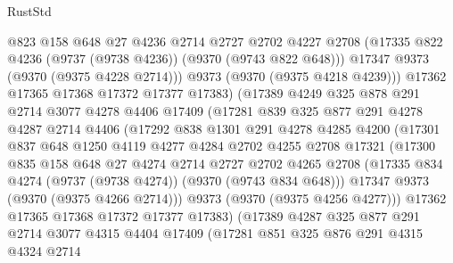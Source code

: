 \begin{lexlean}{RustStd}
\begin{coremodule}
{\begin{coremodule}
{{{{{{{{{{{{{{{{{{{{{{{{{{{{{{{{{{{{{{{                  @823
                  @158
                  @648
                  @27
                  @4236
                  @2714
                  @2727
                  @2702
                  @4227
                  @2708
                  (@17335 @822 @4236 (@9737 (@9738 @4236)) (@9370 (@9743 @822 @648)))
                  @17347
                  @9373
                  (@9370 (@9375 @4228 @2714)))
                @9373
                (@9370 (@9375 @4218 @4239)))
              @17362
              @17365
              @17368
              @17372
              @17377
              @17383)
            (@17389
              @4249
              @325
              @878
              @291
              @2714
              @3077
              @4278
              @4406
              @17409
              (@17281
                @839
                @325
                @877
                @291
                @4278
                @4287
                @2714
                @4406
                (@17292
                  @838
                  @1301
                  @291
                  @4278
                  @4285
                  @4200
                  (@17301
                    @837
                    @648
                    @1250
                    @4119
                    @4277
                    @4284
                    @2702
                    @4255
                    @2708
                    @17321
                    (@17300
                      @835
                      @158
                      @648
                      @27
                      @4274
                      @2714
                      @2727
                      @2702
                      @4265
                      @2708
                      (@17335 @834 @4274 (@9737 (@9738 @4274)) (@9370 (@9743 @834 @648)))
                      @17347
                      @9373
                      (@9370 (@9375 @4266 @2714)))
                    @9373
                    (@9370 (@9375 @4256 @4277)))
                  @17362
                  @17365
                  @17368
                  @17372
                  @17377
                  @17383)
                (@17389
                  @4287
                  @325
                  @877
                  @291
                  @2714
                  @3077
                  @4315
                  @4404
                  @17409
                  (@17281
                    @851
                    @325
                    @876
                    @291
                    @4315
                    @4324
                    @2714
}}}}}}}}}}}}}}}}}}}}}}}}}}}}}}}}}}}}}}}
\end{coremodule}}
\end{coremodule}
\end{lexlean}
